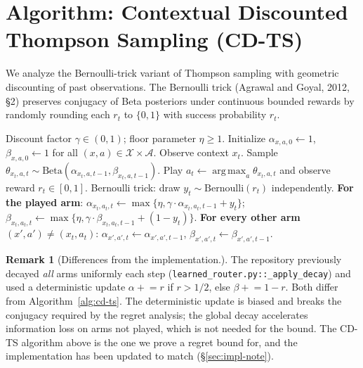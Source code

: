 \documentclass[11pt]{article}
\theoremstyle{definition}
\newtheorem{remark}{Remark}
\newcommand{\Beta}{\mathrm{Beta}}
\newcommand{\Bern}{\mathrm{Bernoulli}}
\DeclareMathOperator*{\argmax}{arg\,max}
\begin{document}
\section{Algorithm: Contextual Discounted Thompson Sampling (CD-TS)}
\label{sec:algorithm}

We analyze the Bernoulli-trick variant of Thompson sampling with geometric discounting of past observations. The Bernoulli trick (Agrawal and Goyal, 2012, \S 2) preserves conjugacy of Beta posteriors under continuous bounded rewards by randomly rounding each $r_t$ to $\{0,1\}$ with success probability $r_t$.

\begin{algorithm}[h]
\caption{Contextual Discounted Thompson Sampling (CD-TS)}
\label{alg:cd-ts}
\begin{algorithmic}[1]
\Require Discount factor $\gamma \in (0,1)$; floor parameter $\eta \geq 1$.
\State Initialize $\alpha_{x,a,0} \gets 1$, $\beta_{x,a,0} \gets 1$ for all $(x,a) \in \mathcal{X} \times \mathcal{A}$.
    \State Observe context $x_t$.
        \State Sample $\theta_{x_t, a, t} \sim \Beta(\alpha_{x_t, a, t-1}, \beta_{x_t, a, t-1})$.
    \EndFor
    \State Play $a_t \gets \argmax_a \theta_{x_t, a, t}$ and observe reward $r_t \in [0,1]$.
    \State Bernoulli trick: draw $y_t \sim \Bern(r_t)$ independently.
    \State \textbf{For the played arm}: \quad $\alpha_{x_t,a_t,t} \gets \max\{\eta, \gamma \cdot \alpha_{x_t,a_t,t-1} + y_t\}$; \quad $\beta_{x_t,a_t,t} \gets \max\{\eta, \gamma \cdot \beta_{x_t,a_t,t-1} + (1-y_t)\}$.
    \State \textbf{For every other arm} $(x',a') \neq (x_t, a_t)$: \quad $\alpha_{x',a',t} \gets \alpha_{x',a',t-1}$, $\beta_{x',a',t} \gets \beta_{x',a',t-1}$.
\EndFor
\end{algorithmic}
\end{algorithm}

\begin{remark}[Differences from the implementation.]
The repository previously decayed \emph{all} arms uniformly each step (\texttt{learned\_router.py::\_apply\_decay}) and used a deterministic update $\alpha \mathrel{+}= r$ if $r > 1/2$, else $\beta \mathrel{+}= 1-r$. Both differ from Algorithm~\ref{alg:cd-ts}. The deterministic update is biased and breaks the conjugacy required by the regret analysis; the global decay accelerates information loss on arms not played, which is not needed for the bound. The CD-TS algorithm above is the one we prove a regret bound for, and the implementation has been updated to match (\S\ref{sec:impl-note}).
\end{remark}
\end{document}
